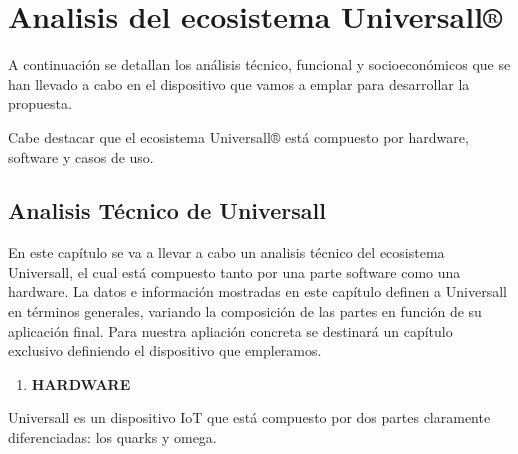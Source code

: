\section{Analisis del ecosistema Universall®}

A continuación se detallan los análisis técnico, funcional y socioeconómicos que se han llevado a cabo en el dispositivo que vamos a emplar para desarrollar la propuesta.

Cabe destacar que el ecosistema Universall® está compuesto por hardware, software y casos de uso.

\subsection{Analisis Técnico de Universall}

En este capítulo se va a llevar  a cabo un analisis técnico del ecosistema Universall, el cual está compuesto tanto por una parte software como una hardware. La datos e información mostradas en este capítulo definen a Universall en términos generales, variando la composición de las partes en función de su aplicación final. Para nuestra apliación concreta se destinará un capítulo exclusivo definiendo el dispositivo que empleramos.

\begin{enumerate}
\item \textbf{HARDWARE}
\end{enumerate}

Universall es un dispositivo IoT que está compuesto por dos partes claramente diferenciadas: los quarks y omega.

